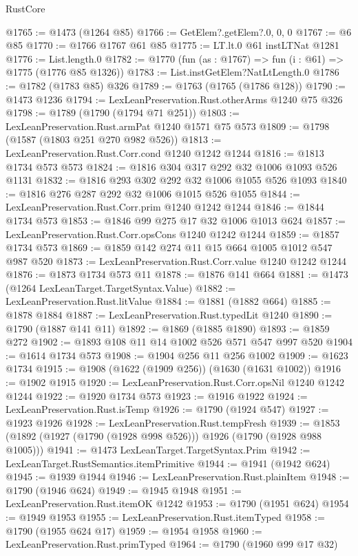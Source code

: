 \begin{lexlean}{RustCore}
\begin{coremodule}
@1765 := @1473 (@1264 @85)
@1766 := GetElem?.getElem?.{0, 0, 0}
@1767 := @6 @85
@1770 := @1766 @1767 @61 @85
@1775 := LT.lt.{0} @61 instLTNat @1281
@1776 := List.length.{0}
@1782 := @1770 (fun (as : @1767) => fun (i : @61) => @1775 (@1776 @85 @1326))
@1783 := List.instGetElem?NatLtLength.{0}
@1786 := @1782 (@1783 @85) @326
@1789 := @1763 (@1765 (@1786 @128))
@1790 := @1473 @1236
@1794 := LexLeanPreservation.Rust.otherArms @1240 @75 @326
@1798 := @1789 (@1790 (@1794 @71 @251))
@1803 := LexLeanPreservation.Rust.armPat @1240 @1571 @75 @573
@1809 := @1798 (@1587 (@1803 @251 @270 @982 @526))
@1813 := LexLeanPreservation.Rust.Corr.cond @1240 @1242 @1244
@1816 := @1813 @1734 @573 @573
@1824 := @1816 @304 @317 @292 @32 @1006 @1093 @526 @1131
@1832 := @1816 @293 @302 @292 @32 @1006 @1055 @526 @1093
@1840 := @1816 @276 @287 @292 @32 @1006 @1015 @526 @1055
@1844 := LexLeanPreservation.Rust.Corr.prim @1240 @1242 @1244
@1846 := @1844 @1734 @573
@1853 := @1846 @99 @275 @17 @32 @1006 @1013 @624
@1857 := LexLeanPreservation.Rust.Corr.opsCons @1240 @1242 @1244
@1859 := @1857 @1734 @573
@1869 := @1859 @142 @274 @11 @15 @664 @1005 @1012 @547 @987 @520
@1873 := LexLeanPreservation.Rust.Corr.value @1240 @1242 @1244
@1876 := @1873 @1734 @573 @11
@1878 := @1876 @141 @664
@1881 := @1473 (@1264 LexLeanTarget.TargetSyntax.Value)
@1882 := LexLeanPreservation.Rust.litValue
@1884 := @1881 (@1882 @664)
@1885 := @1878 @1884
@1887 := LexLeanPreservation.Rust.typedLit @1240
@1890 := @1790 (@1887 @141 @11)
@1892 := @1869 (@1885 @1890)
@1893 := @1859 @272
@1902 := @1893 @108 @11 @14 @1002 @526 @571 @547 @997 @520
@1904 := @1614 @1734 @573
@1908 := @1904 @256 @11 @256 @1002
@1909 := @1623 @1734
@1915 := @1908 (@1622 (@1909 @256)) (@1630 (@1631 @1002))
@1916 := @1902 @1915
@1920 := LexLeanPreservation.Rust.Corr.opsNil @1240 @1242 @1244
@1922 := @1920 @1734 @573
@1923 := @1916 @1922
@1924 := LexLeanPreservation.Rust.isTemp
@1926 := @1790 (@1924 @547)
@1927 := @1923 @1926
@1928 := LexLeanPreservation.Rust.tempFresh
@1939 := @1853 (@1892 (@1927 (@1790 (@1928 @998 @526))) @1926 (@1790 (@1928 @988 @1005)))
@1941 := @1473 LexLeanTarget.TargetSyntax.Prim
@1942 := LexLeanTarget.RustSemantics.itemPrimitive
@1944 := @1941 (@1942 @624)
@1945 := @1939 @1944
@1946 := LexLeanPreservation.Rust.plainItem
@1948 := @1790 (@1946 @624)
@1949 := @1945 @1948
@1951 := LexLeanPreservation.Rust.itemOK @1242
@1953 := @1790 (@1951 @624)
@1954 := @1949 @1953
@1955 := LexLeanPreservation.Rust.itemTyped
@1958 := @1790 (@1955 @624 @17)
@1959 := @1954 @1958
@1960 := LexLeanPreservation.Rust.primTyped
@1964 := @1790 (@1960 @99 @17 @32)

\end{coremodule}
\end{lexlean}
